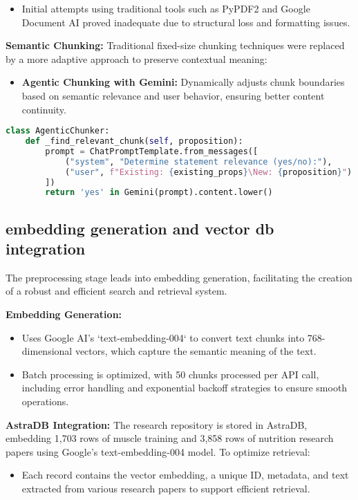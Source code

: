 \documentclass[conference]{IEEEtran}
\begin{document}
\begin{itemize}
    \item Initial attempts using traditional tools such as PyPDF2 and Google Document AI proved inadequate due to structural loss and formatting issues.
\end{itemize}

\textbf{Semantic Chunking:}
Traditional fixed-size chunking techniques were replaced by a more adaptive approach to preserve contextual meaning:
\begin{itemize}
    \item \textbf{Agentic Chunking with Gemini:} Dynamically adjusts chunk boundaries based on semantic relevance and user behavior, ensuring better content continuity.
\end{itemize}

\begin{lstlisting}[language=Python]
class AgenticChunker:
    def _find_relevant_chunk(self, proposition):
        prompt = ChatPromptTemplate.from_messages([
            ("system", "Determine statement relevance (yes/no):"),
            ("user", f"Existing: {existing_props}\New: {proposition}")
        ])
        return 'yes' in Gemini(prompt).content.lower()
\end{lstlisting}

\subsection{embedding generation and vector db integration}
The preprocessing stage leads into embedding generation, facilitating the creation of a robust and efficient search and retrieval system.

\textbf{Embedding Generation:}
\begin{itemize}
    \item Uses Google AI's `text-embedding-004` to convert text chunks into 768-dimensional vectors, which capture the semantic meaning of the text.
    \item Batch processing is optimized, with 50 chunks processed per API call, including error handling and exponential backoff strategies to ensure smooth operations.
\end{itemize}

\textbf{AstraDB Integration:}
The research repository is stored in AstraDB, embedding 1,703 rows of muscle training and 3,858 rows of nutrition research papers using Google's text-embedding-004 model. To optimize retrieval:
\begin{itemize}
    \item Each record contains the vector embedding, a unique ID, metadata, and text extracted from various research papers to support efficient retrieval.
\end{itemize}
\end{document}
